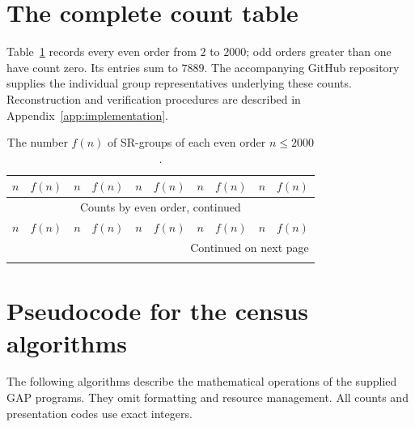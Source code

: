 \documentclass[11pt,a4paper]{amsart}
\theoremstyle{definition}
\theoremstyle{remark}
\numberwithin{equation}{section}
\begin{document}
\clearpage
\appendix
\section{The complete count table}\label{sec:counttable}
Table~\ref{tab:all-counts} records every even order from $2$ to $2000$;
odd orders greater than one have count zero. Its entries sum to $7889$.
The accompanying GitHub repository supplies the individual group
representatives underlying these counts. Reconstruction and verification
procedures are described in Appendix~\ref{app:implementation}.

{\small\setlength{\tabcolsep}{5pt}
\begin{longtable}{*{5}{rr}}
\caption{The number $f(n)$ of SR-groups of each even order $n\le2000$.}\label{tab:all-counts}\\
\toprule
$n$&$f(n)$&$n$&$f(n)$&$n$&$f(n)$&$n$&$f(n)$&$n$&$f(n)$\\\midrule
\endfirsthead
\multicolumn{10}{c}{Counts by even order, continued}\\\toprule
$n$&$f(n)$&$n$&$f(n)$&$n$&$f(n)$&$n$&$f(n)$&$n$&$f(n)$\\\midrule
\endhead
\midrule\multicolumn{10}{r}{Continued on next page}\\\endfoot
\bottomrule\endlastfoot

\end{longtable}}

\clearpage
\section{Pseudocode for the census algorithms}\label{app:algorithms}
The following algorithms describe the mathematical operations of
the supplied GAP programs. They omit formatting and resource
management. All counts and presentation codes use exact integers.
\end{document}
